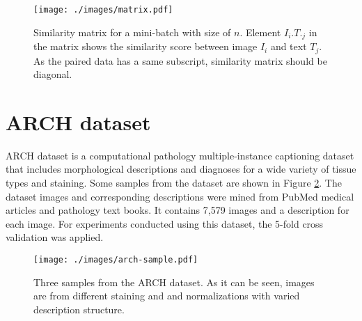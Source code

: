 \documentclass{midl}
\begin{document}
\begin{figure}[h!]
    \centering
    \texttt{[image: ./images/matrix.pdf]}
    \caption{Similarity matrix for a mini-batch with size of $n$. Element $I_i.T._j$ in the matrix shows the similarity score between image $I_i$ and text $T_j$. As the paired data has a same subscript, similarity matrix should be diagonal. }
    \label{matrix}
\end{figure}

\section{ARCH dataset}\label{appb} ARCH dataset\cite{gamper2021multiple} is a computational pathology multiple-instance captioning dataset that includes morphological descriptions and diagnoses for a wide variety of tissue types and staining. Some samples from the dataset are shown in Figure \ref{arch-dataset-sample}. The dataset images and corresponding descriptions were mined from PubMed medical articles and pathology text books. It contains 7,579 images and a description for each image. For experiments conducted using this dataset, the 5-fold cross validation was applied.


\begin{figure}
    \centering
    \texttt{[image: ./images/arch-sample.pdf]}
    \caption{Three samples from the ARCH dataset. As it can be seen, images are from different staining and and normalizations with varied description structure.}
    \label{arch-dataset-sample}
\end{figure}
\end{document}
